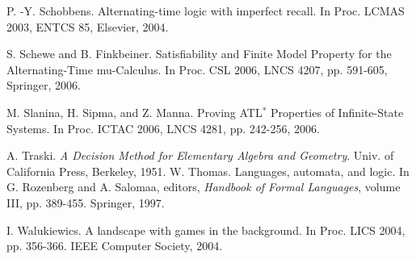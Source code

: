 \documentclass[times, 10 pt,twocolumn]{article}
\begin{document}
\begin{thebibliography}{00}
 P. -Y. Schobbens. Alternating-time logic with
imperfect recall. In Proc. LCMAS 2003, ENTCS 85, Elsevier, 2004.

 S. Schewe and B. Finkbeiner. Satisfiability and Finite Model
Property for the Alternating-Time mu-Calculus. In Proc. CSL 2006,
LNCS 4207, pp. 591-605, Springer, 2006.

 M. Slanina, H. Sipma, and Z. Manna. Proving
ATL$^*$ Properties of Infinite-State Systems. In Proc. ICTAC 2006,
LNCS 4281, pp. 242-256, 2006.

 A. Traski. \emph{A Decision Method for Elementary
Algebra and Geometry}. Univ. of California Press, Berkeley, 1951.
%
 W. Thomas. Languages, automata, and logic. In G. Rozenberg and A.
Salomaa, editors, {\em Handbook of Formal Languages}, volume III,
pp. 389-455. Springer, 1997.

 I. Walukiewics. A landscape with games in the
background. In Proc. LICS 2004, pp. 356-366. IEEE Computer
Society, 2004.


\end{thebibliography}
\end{document}
